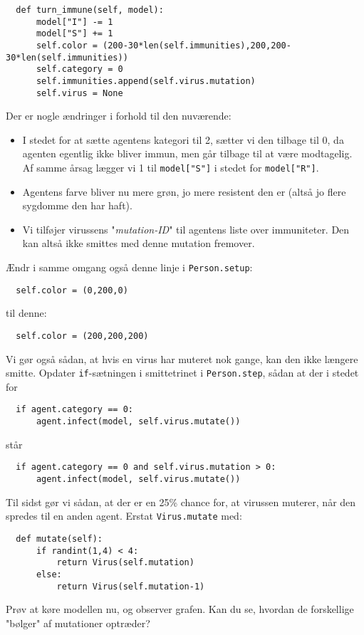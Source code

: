 \documentclass{article}
\begin{document}
\begin{lstlisting}
  def turn_immune(self, model):
      model["I"] -= 1
      model["S"] += 1
      self.color = (200-30*len(self.immunities),200,200-30*len(self.immunities))
      self.category = 0
      self.immunities.append(self.virus.mutation)
      self.virus = None
\end{lstlisting}
Der er nogle ændringer i forhold til den nuværende:
\begin{itemize}
\item I stedet for at sætte agentens kategori til 2, sætter vi den tilbage til 0, da agenten egentlig ikke bliver immun, men går tilbage til at være modtagelig. Af samme årsag lægger vi 1 til \texttt{model["S"]} i stedet for \texttt{model["R"]}.
\item Agentens farve bliver nu mere grøn, jo mere resistent den er (altså jo flere sygdomme den har haft).
\item Vi tilføjer virussens "\textit{mutation-ID}" til agentens liste over immuniteter. Den kan altså ikke smittes med denne mutation fremover.
\end{itemize}
Ændr i samme omgang også denne linje i \texttt{Person.setup}:
\begin{lstlisting}
  self.color = (0,200,0)
\end{lstlisting}
til denne:
\begin{lstlisting}
  self.color = (200,200,200)
\end{lstlisting}
Vi gør også sådan, at hvis en virus har muteret nok gange, kan den ikke længere smitte. Opdater \texttt{if}-sætningen i smittetrinet i \texttt{Person.step}, sådan at der i stedet for
\begin{lstlisting}
  if agent.category == 0:
      agent.infect(model, self.virus.mutate())
\end{lstlisting}
står
\begin{lstlisting}
  if agent.category == 0 and self.virus.mutation > 0:
      agent.infect(model, self.virus.mutate())
\end{lstlisting}
Til sidst gør vi sådan, at der er en 25\% chance for, at virussen muterer, når den spredes til en anden agent. Erstat \texttt{Virus.mutate} med:
\begin{lstlisting}
  def mutate(self):
      if randint(1,4) < 4:
          return Virus(self.mutation)
      else:
          return Virus(self.mutation-1)
\end{lstlisting}
Prøv at køre modellen nu, og observer grafen. Kan du se, hvordan de forskellige "bølger" af mutationer optræder?
\end{document}
